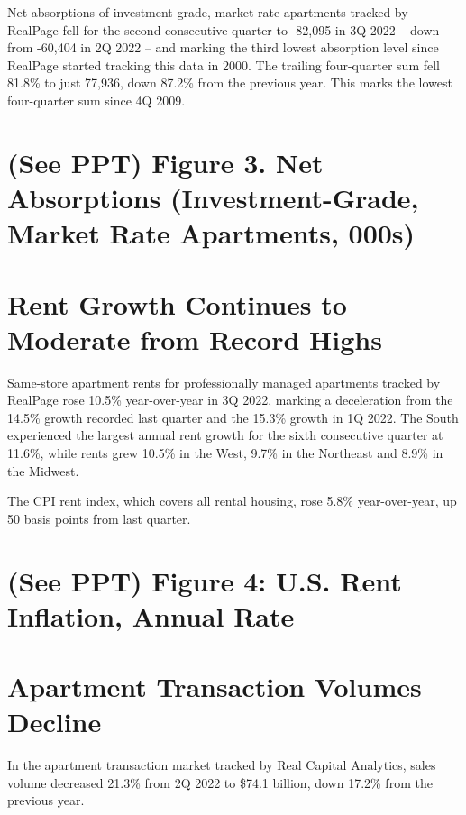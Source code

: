 \documentclass{article}
\begin{document}
Net absorptions of investment-grade, market-rate apartments tracked by RealPage fell for the second consecutive quarter to -82,095 in 3Q 2022 – down from -60,404 in 2Q 2022 $–$ and marking the third lowest absorption level since RealPage started tracking this data in 2000. The trailing four-quarter sum fell 81.8\% to just 77,936, down 87.2\% from the previous year. This marks the lowest four-quarter sum since 4Q 2009. 

\bigskip

\section*{\normalsize (See PPT) Figure 3. Net Absorptions (Investment-Grade, Market Rate Apartments, 000s)}

\bigskip

\section*{\normalsize Rent Growth Continues to Moderate from Record Highs}

Same-store apartment rents for professionally managed apartments tracked by RealPage rose 10.5\% year-over-year in 3Q 2022, marking a deceleration from the 14.5\% growth recorded last quarter and the 15.3\% growth in 1Q 2022. 
The South experienced the largest annual rent growth for the sixth consecutive quarter at 11.6\%, while rents grew 10.5\% in the West, 9.7\% in the Northeast and 8.9\% in the Midwest. 

\medskip

\noindent The CPI rent index, which covers all rental housing, rose 5.8\% year-over-year, up 50 basis points from last quarter. 

\bigskip

\section*{\normalsize (See PPT) Figure 4: U.S. Rent Inflation, Annual Rate}

\bigskip

\section*{\normalsize Apartment Transaction Volumes Decline}

In the apartment transaction market tracked by Real Capital Analytics, sales volume decreased 21.3\% from 2Q 2022 to \$74.1 billion, down 17.2\% from the previous year. 
\end{document}
